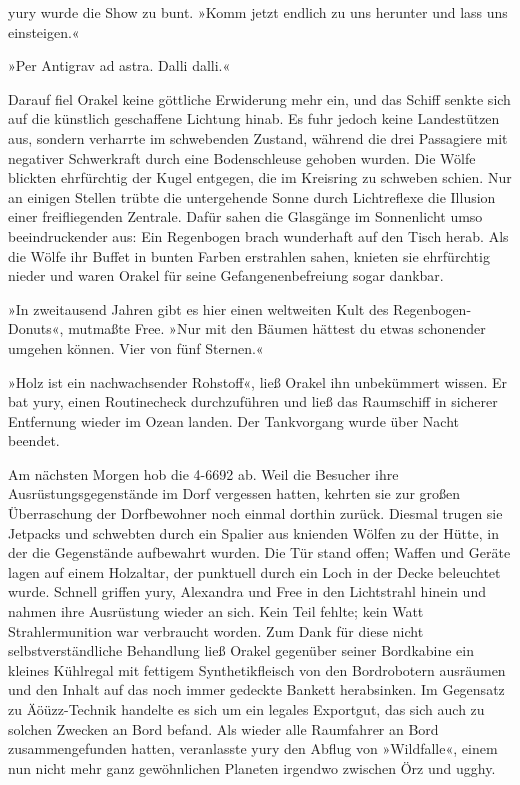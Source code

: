 
yury wurde die Show zu bunt. »Komm jetzt endlich zu uns herunter und lass uns einsteigen.«


»Per Antigrav ad astra. Dalli dalli.«

Darauf fiel Orakel keine göttliche Erwiderung mehr ein, und das Schiff senkte sich auf die künstlich geschaffene Lichtung hinab. Es fuhr jedoch keine Landestützen aus, sondern verharrte im schwebenden Zustand, während die drei Passagiere mit negativer Schwerkraft durch eine Bodenschleuse gehoben wurden. Die Wölfe blickten ehrfürchtig der Kugel entgegen, die im Kreisring zu schweben schien. Nur an einigen Stellen trübte die untergehende Sonne durch Lichtreflexe die Illusion einer freifliegenden Zentrale. Dafür sahen die Glasgänge im Sonnenlicht umso beeindruckender aus: Ein Regenbogen brach wunderhaft auf den Tisch herab. Als die Wölfe ihr Buffet in bunten Farben erstrahlen sahen, knieten sie ehrfürchtig nieder und waren Orakel für seine Gefangenenbefreiung sogar dankbar.

»In zweitausend Jahren gibt es hier einen weltweiten Kult des Regenbogen-Donuts«, mutmaßte Free. »Nur mit den Bäumen hättest du etwas schonender umgehen können. Vier von fünf Sternen.«

»Holz ist ein nachwachsender Rohstoff«, ließ Orakel ihn unbekümmert wissen. Er bat yury, einen Routinecheck durchzuführen und ließ das Raumschiff in sicherer Entfernung wieder im Ozean landen. Der Tankvorgang wurde über Nacht beendet.

Am nächsten Morgen hob die 4-6692 ab. Weil die Besucher ihre Ausrüstungsgegenstände im Dorf vergessen hatten, kehrten sie zur großen Überraschung der Dorfbewohner noch einmal dorthin zurück. Diesmal trugen sie Jetpacks und schwebten durch ein Spalier aus knienden Wölfen zu der Hütte, in der die Gegenstände aufbewahrt wurden. Die Tür stand offen; Waffen und Geräte lagen auf einem Holzaltar, der punktuell durch ein Loch in der Decke beleuchtet wurde. Schnell griffen yury, Alexandra und Free in den Lichtstrahl hinein und nahmen ihre Ausrüstung wieder an sich. Kein Teil fehlte; kein Watt Strahlermunition war verbraucht worden. Zum Dank für diese nicht selbstverständliche Behandlung ließ Orakel gegenüber seiner Bordkabine ein kleines Kühlregal mit fettigem Synthetikfleisch von den Bordrobotern ausräumen und den Inhalt auf das noch immer gedeckte Bankett herabsinken. Im Gegensatz zu Äöüzz-Technik handelte es sich um ein legales Exportgut, das sich auch zu solchen Zwecken an Bord befand. Als wieder alle Raumfahrer an Bord zusammengefunden hatten, veranlasste yury den Abflug von »Wildfalle«, einem nun nicht mehr ganz gewöhnlichen Planeten irgendwo zwischen Örz und ugghy.


